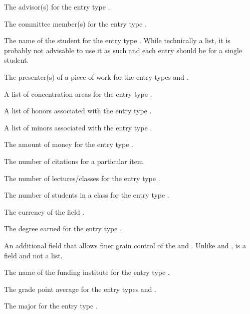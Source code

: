 \documentclass{ltxdockit}[2011/03/25]
\begin{document}
\begin{fieldlist}
	 The advisor(s) for the entry type .

	 The committee member(s) for the entry type .

	 The name of the student for the entry type . While technically a list, it is probably not advisable to use it as such and each  entry should be for a single student.

	 The presenter(s) of a piece of work for the entry types  and .

	 A list of concentration areas for the entry type .

	 A list of honors associated with the entry type .

	 A list of minors associated with the entry type .

	 The amount of money for the entry type .

	 The number of citations for a particular item.

	 The number of lectures/classes for the entry type .

	 The number of students in a class for the entry type .

	 The currency of the field .

	 The degree earned for the entry type .

	 An additional field that allows finer grain control of the  and . Unlike  and ,  is a field and not a list.

	 The name of the funding institute for the entry type .

	 The grade point average for the entry types  and .

	 The major for the entry type .



\end{fieldlist}
\end{document}
